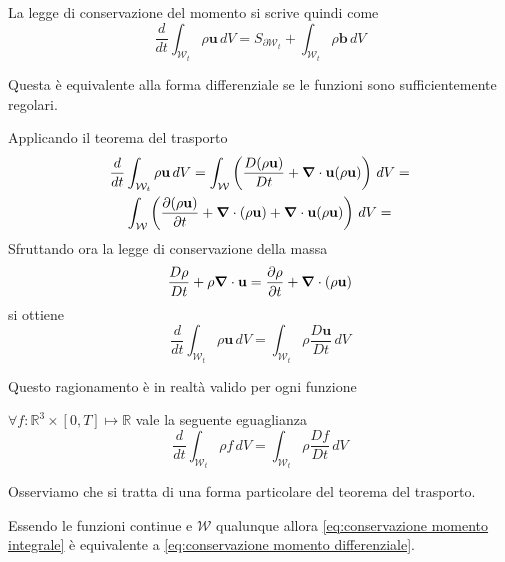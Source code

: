 La legge di conservazione del momento si scrive quindi come
\begin{equation}\label{eq:conservazione momento integrale}
\frac{d}{dt} \int_{\mathcal{W}_t} \rho \mathbf{u} \, dV = S_{\partial \mathcal{W}_t} +  \int_{\mathcal{W}_t} \rho \mathbf{b} \, dV
\end{equation}

Questa è equivalente alla forma differenziale se le funzioni sono sufficientemente regolari.

Applicando il teorema del trasporto
\begin{multline*}
\frac{d}{dt} \int_{\mathcal{W}_t} \rho \mathbf{u} \, dV = \int_{\mathcal{W}}\left(\frac{D(\rho \mathbf{u})}{D t}+\boldsymbol{\nabla}\cdot\mathbf{u}(\rho \mathbf{u}) \right)\, dV = \\
\int_{\mathcal{W}}\left(\frac{\partial(\rho \mathbf{u})}{\partial t}+\boldsymbol{\nabla}\cdot(\rho \mathbf{u})+\boldsymbol{\nabla}\cdot\mathbf{u}(\rho \mathbf{u}) \right)\, dV = \\
\end{multline*}
Sfruttando ora la legge di conservazione della massa
\begin{equation*}
\frac{D\rho}{D t}+\rho\boldsymbol{\nabla}\cdot\mathbf{u} = \frac{\partial\rho}{\partial t} + \boldsymbol{\nabla}\cdot(\rho\mathbf{u})
\end{equation*}
si ottiene
\begin{equation*}
\frac{d}{dt} \int_{\mathcal{W}_t} \rho \mathbf{u} \, dV = \int_{\mathcal{W}_t} \rho \frac{D\mathbf{u}}{Dt}\, dV
\end{equation*}

Questo ragionamento è in realtà valido per ogni funzione
\begin{theorem}
$\forall f:\mathbb{R}^3\times[0,T]\mapsto \mathbb{R}$ vale la seguente eguaglianza
\begin{equation*}
\frac{d}{dt}\int_{\mathcal{W}_t}\rho f\, dV = \int_{\mathcal{W}_t}\rho\frac{Df}{Dt}\,dV
\end{equation*}
\end{theorem}
Osserviamo che si tratta di una forma particolare del teorema del trasporto.

Essendo le funzioni continue e $\mathcal{W}$ qualunque allora \ref{eq:conservazione momento integrale} è equivalente a \ref{eq:conservazione momento differenziale}.

